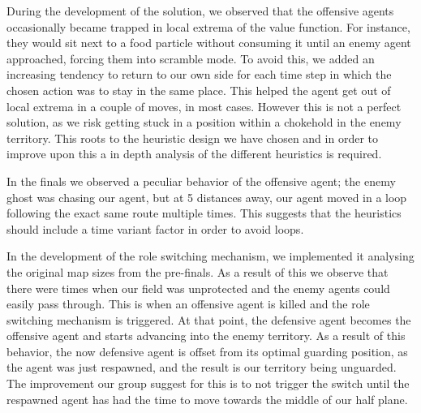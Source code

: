 \documentclass[a4paper,12pt]{article}
\begin{document}
During the development of the solution, we observed that the offensive agents occasionally became trapped in local extrema of the value function. For instance, they would sit next to a food particle without consuming it until an enemy agent approached, forcing them into scramble mode.
To avoid this, we added an increasing tendency to return to our own side for each time step in which the chosen action was to stay in the same place. 
This helped the agent get out of local extrema in a couple of moves, in most cases. 
However this is not a perfect solution, as we risk getting stuck in a position within a chokehold in the enemy territory. This roots to the heuristic design we have chosen and in order to improve upon this a in depth analysis of the different heuristics is required.

In the finals we observed a peculiar behavior of the offensive agent; the enemy ghost was chasing our agent, but at 5 distances away, our agent moved in a loop following the exact same route multiple times. This suggests that the heuristics should include a time variant factor in order to avoid loops.

In the development of the role switching mechanism, we implemented it analysing the original map sizes from the pre-finals. 
As a result of this we observe that there were times when our field was unprotected and the enemy agents could easily pass through. 
This is when an offensive agent is killed and the role switching mechanism is triggered. At that point, the defensive agent becomes the offensive agent and starts advancing into the enemy territory. As a result of this behavior, the now defensive agent is offset from its optimal guarding position, as the agent was just respawned, and the result is our territory being unguarded. The improvement our group suggest for this is to not trigger the switch until the respawned agent has had the time to move towards the middle of our half plane.








\printbibliography

\end{document}
